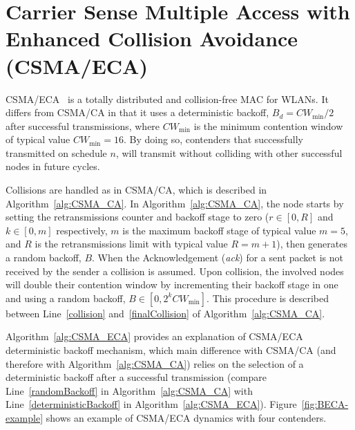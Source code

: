 \documentclass[a4paper,journal]{IEEEtran}
\begin{document}
\section{Carrier Sense Multiple Access with Enhanced Collision Avoidance (CSMA/ECA)}\label{introProtocol}

CSMA/ECA~\cite{barcelo2008lba} is a totally distributed and collision-free MAC for WLANs. It differs from CSMA/CA in that it uses a deterministic backoff, $B_{d}=CW_{\min}/2$ after successful transmissions, where $CW_{\min}$ is the minimum contention window of typical value $CW_{\min}=16$. By doing so, contenders that successfully transmitted on schedule $n$, will transmit without colliding with other successful nodes in future cycles.

Collisions are handled as in CSMA/CA, which is described in Algorithm~\ref{alg:CSMA_CA}. In Algorithm~\ref{alg:CSMA_CA}, the node starts by setting the retransmissions counter and backoff stage to zero ($r\in[0,R]$ and $k\in[0,m]$ respectively, $m$ is the maximum backoff stage of typical value $m=5$, and $R$ is the retransmissions limit with typical value $R=m+1$), then generates a random backoff, $B$. When the Acknowledgement (\emph{ack}) for a sent packet is not received by the sender a collision is assumed. Upon collision, the involved nodes will double their contention window by incrementing their backoff stage in one and using a random backoff, $B\in[0,2^{k}CW_{\min}]$. This procedure is described between Line~\ref{collision} and~\ref{finalCollision} of Algorithm~\ref{alg:CSMA_CA}.

Algorithm~\ref{alg:CSMA_ECA} provides an explanation of CSMA/ECA deterministic backoff mechanism, which main difference with CSMA/CA (and therefore with Algorithm~\ref{alg:CSMA_CA}) relies on the selection of a deterministic backoff after a successful transmission (compare Line~\ref{randomBackoff} in Algorithm~\ref{alg:CSMA_CA} with Line~\ref{deterministicBackoff} in Algorithm~\ref{alg:CSMA_ECA}). Figure~\ref{fig:BECA-example} shows an example of CSMA/ECA dynamics with four contenders.
\end{document}
